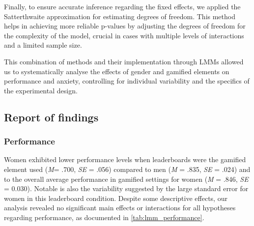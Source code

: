 Finally, to ensure accurate inference regarding the fixed effects, we applied the Satterthwaite \parencite{satterthwaiteApproximateDistributionEstimates1946} approximation for estimating degrees of freedom.
This method helps in achieving more reliable p-values by adjusting the degrees of freedom for the complexity of the model, crucial in cases with multiple levels of interactions and a limited sample size.

This combination of methods and their implementation through LMMs allowed us to systematically analyse the effects of gender and gamified elements on performance and anxiety, controlling for individual variability and the specifics of the experimental design.

\subsection{Report of findings}

\subsubsection{Performance}
Women exhibited lower performance levels when leaderboards were the gamified element used (\textit{M}= .700, \textit{SE} = .056) compared to men (\textit{M} = .835, \textit{SE} = .024) and to the overall average performance in gamified settings for women (\textit{M} = .846, \textit{SE} = 0.030).
Notable is also the variability suggested by the large standard error for women in this leaderboard condition.
Despite some descriptive effects, our analysis revealed no significant main effects or interactions for all hypotheses regarding performance, as documented in \autoref{tab:lmm_performance}.

